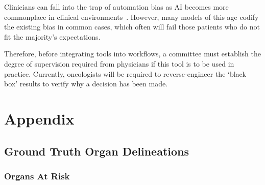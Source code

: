 \documentclass[12pt,twoside]{report}
\begin{document}
Clinicians can fall into the trap of automation bias as AI becomes more commonplace in clinical environments~\cite{STRAW2020101965}. However, many models of this age codify the existing bias in common cases, which often will fail those patients who do not fit the majority's expectations. 

Therefore, before integrating tools into workflows, a committee must establish the degree of supervision required from physicians if this tool is to be used in practice. Currently, oncologists will be required to reverse-engineer the `black box' results to verify why a decision has been made. 


\clearpage

\appendix

\chapter{Appendix}

\section{Ground Truth Organ Delineations}

\subsection{Organs At Risk}
\end{document}
